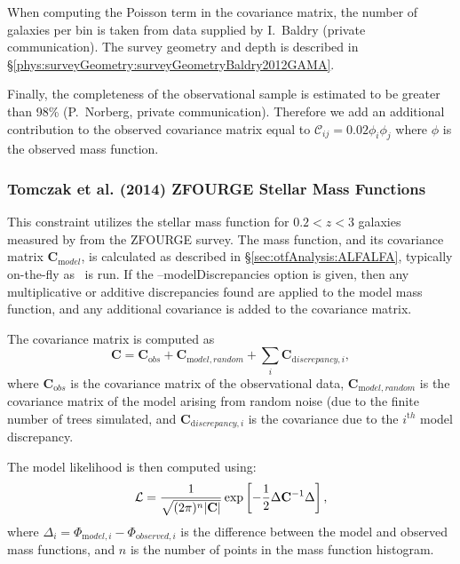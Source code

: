 When computing the Poisson term in the covariance matrix, the number of galaxies per bin is taken from data supplied by I.~Baldry (private communication). The survey geometry and depth is described in \S\ref{phys:surveyGeometry:surveyGeometryBaldry2012GAMA}.

Finally, the completeness of the observational sample is estimated to be greater than 98\% (P.~Norberg, private communication). Therefore we add an additional contribution to the observed covariance matrix equal to $\mathcal{C}_{ij} = 0.02 \phi_i \phi_j$ where $\phi$ is the observed mass function.

\subsubsection{Tomczak et al. (2014) ZFOURGE Stellar Mass Functions}\label{sec:AnalysisTomczakZFOURGEStellarMassFunction}

This constraint utilizes the stellar mass function for $0.2 < z< 3$ galaxies measured by \cite{tomczak_galaxy_2014} from the ZFOURGE survey. The mass function, and its covariance matrix ${\mathbf C}_{\mathrm model}$, is calculated as described in \S\ref{sec:otfAnalysis:ALFALFA}, typically on-the-fly as \glc\ is run. If the {\normalfont \ttfamily --modelDiscrepancies} option is given, then any multiplicative or additive discrepancies found are applied to the model mass function, and any additional covariance is added to the covariance matrix.

The covariance matrix is computed as
\begin{equation}
 {\mathbf C} = {\mathbf C}_{\mathrm obs} + {\mathbf C}_{\mathrm model,random} + \sum_i {\mathbf C}_{{\mathrm discrepancy}, i},
\end{equation}
where ${\mathbf C}_{\mathrm obs}$ is the covariance matrix of the observational data, ${\mathbf C}_{\mathrm model,random}$ is the covariance matrix of the model arising from random noise (due to the finite number of trees simulated, and ${\mathbf C}_{{\mathrm discrepancy}, i}$ is the covariance due to the $i^{\mathrm th}$ model discrepancy.

The model likelihood is then computed using:
\begin{equation}
 \mathcal{L} = {1 \over \sqrt{(2 \pi)^n |{\mathbf C}|}} \exp\left[ -{1\over 2} \Delta {\mathbf C}^{-1} \Delta \right],
\end{equation}
where $\Delta_i = \Phi_{{\mathrm model}, i} - \Phi_{{\mathrm observed}, i}$ is the difference between the model and observed mass functions, and $n$ is the number of points in the mass function histogram.

